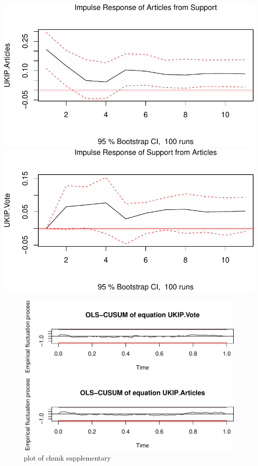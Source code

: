 \documentclass[12pt,article]{article}
\begin{document}
\includegraphics{ukip_media_files/figure-latex/unnamed-chunk-61.pdf}
\includegraphics{ukip_media_files/figure-latex/unnamed-chunk-62.pdf}

\pagebreak

\begin{figure}[htbp]
\centering
\includegraphics{ukip_media_files/figure-latex/supplementary.pdf}
\caption{plot of chunk supplementary}
\end{figure}
\end{document}
